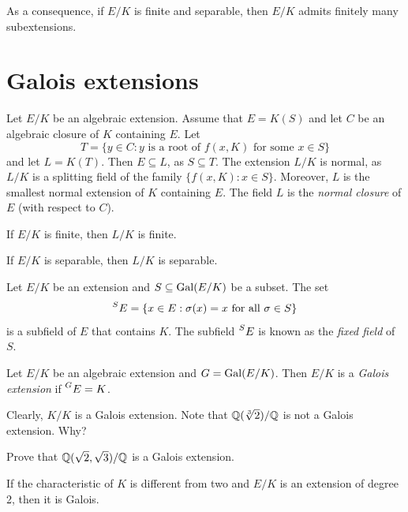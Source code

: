 As a consequence, if $E/K$ is finite and separable, then $E/K$ admits
finitely many subextensions. 

\section{Galois extensions}

Let $E/K$ be an algebraic extension. Assume that $E=K(S)$ and
let $C$ be an algebraic closure of $K$ containing $E$. Let 
\[
T=\{y\in C:y\text{ is a root of $f(x,K)$ for some $x\in S$}\}
\]
and let $L=K(T)$. Then $E\subseteq L$, as $S\subseteq T$. The extension
$L/K$ is normal, as $L/K$ is a splitting field of the family $\{f(x,K):x\in S\}$. 
Moreover, $L$ is the smallest normal extension of $K$ containing $E$. The field
$L$ is the \emph{normal closure} of $E$ (with respect to $C$). 

\begin{exercise}
If $E/K$ is finite, then $L/K$ is finite.
\end{exercise}

\begin{exercise}
If $E/K$ is separable, then $L/K$ is separable.
\end{exercise}

Let $E/K$ be an extension and $S\subseteq\operatorname{Gal}(E/K)$ be a subset. 
The set 
\[
    \prescript{S}{}{E}=\{x\in E:\sigma(x)=x\text{ for all $\sigma\in S$}\}
\]
is a subfield of $E$ that contains $K$. The subfield $\prescript{S}{}{E}$
is known as the \emph{fixed field} of $S$. 

\begin{definition}
    Let $E/K$ be an algebraic extension and $G=\operatorname{Gal}(E/K)$. 
    Then $E/K$ is a \emph{Galois extension} if $\prescript{G}{}{E}=K$. 
\end{definition}

Clearly, $K/K$ is a Galois extension. 
Note that $\mathbb{Q}(\sqrt[3]{2})/\mathbb{Q}$ is not a Galois extension. Why?

\begin{exercise}
    Prove that $\mathbb{Q}(\sqrt{2},\sqrt{3})/\mathbb{Q}$ is a Galois extension. 
\end{exercise}

\begin{exercise}
If the characteristic of $K$ is different from two and $E/K$ is an extension of degree 2, then it is Galois. 
\end{exercise}

